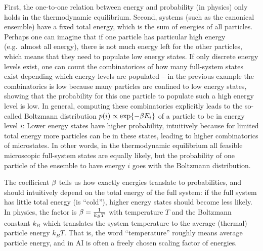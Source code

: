 First, the one-to-one relation between energy and probability (in
physics) only holds in the thermodynamic
equilibrium. Second, systems (such as the canonical ensemble) have a
fixed total energy, which is the sum of energies of all
particles. Perhaps one can imagine that if one particle has particular
high energy (e.g.\ almost all energy), there is not much energy left
for the other particles, which means that they need to populate low
energy states. If only discrete energy levels exist, one can
count the combinatorices of how many full-system states exist depending which energy levels
are populated -- in the previous example the combinatorics is low
because many particles are confined to low energy states, showing that
the probability for this one particle to populate such a high energy
level is low. In general,
computing these combinatorics explicitly leads to the so-called
Boltzmann distribution $p(i) \propto \exp\lbrace-\beta E_i\rbrace$ of a particle to
be in energy level $i$: Lower energy states have higher probability,
intuitively because for limited total energy more particles can be in these
states, leading to higher combinatorics of microstates. In other
words, in the thermodynamic equilibrium all feasible microscopic
full-system states are equally likely, but the probability of one
particle of the ensemble to have energy $i$ goes with the Boltzmann
distribution.

The coefficient $\beta$ tells us how exactly energies
translate to probabilities, and should intuitively depend on the total
energy of the full system: if the full system has little total energy
(is ``cold''), higher energy states should become less likely. In
physics, the factor is $\beta=\textstyle\frac{1}{k_B T}$ with temperature $T$ and
the Boltzmann constant $k_B$ which translates the system temperature
to the average (thermal) particle energy $k_B T$. That is,
the word ``temperature'' roughly means average particle energy, and in
AI is often a freely chosen scaling factor of energies.



